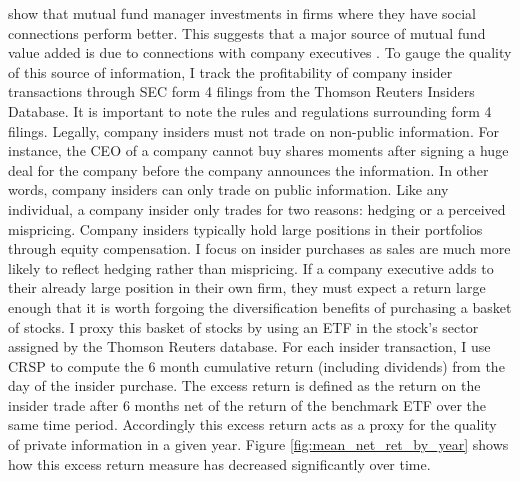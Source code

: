 \documentclass[12pt]{article}
\begin{document}
\citet{CFM} show that mutual fund manager investments in firms where they have social connections perform better. This suggests that a major source of mutual fund value added is due to connections with company executives \citep{CFM}. To gauge the quality of this source of information, I track the profitability of company insider transactions through SEC form 4 filings from the Thomson Reuters Insiders Database. It is important to note the rules and regulations surrounding form 4 filings. Legally, company insiders must not trade on non-public information. For instance, the CEO of a company cannot buy shares moments after signing a huge deal for the company before the company announces the information. In other words, company insiders can only trade on public information. Like any individual, a company insider only trades for two reasons: hedging or a perceived mispricing. Company insiders typically hold large positions in their portfolios through equity compensation. I focus on insider purchases as sales are much more likely to reflect hedging rather than mispricing. If a company executive adds to their already large position in their own firm, they must expect a return large enough that it is worth forgoing the diversification benefits of purchasing a basket of stocks. I proxy this basket of stocks by using an ETF in the stock's sector assigned by the Thomson Reuters database. For each insider transaction, I use CRSP to compute the 6 month cumulative return (including dividends) from the day of the insider purchase. The excess return is defined as the return on the insider trade after 6 months net of the return of the benchmark ETF over the same time period. Accordingly this excess return acts as a proxy for the quality of private information in a given year. Figure \ref{fig:mean_net_ret_by_year} shows how this excess return measure has decreased significantly over time.
\end{document}
